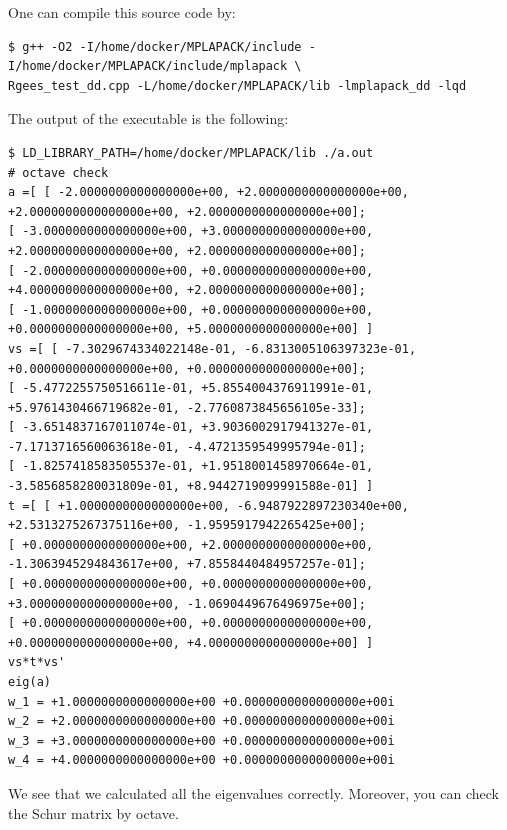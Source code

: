 \documentclass[12pt]{article}
\begin{document}
One can compile this source code by:
\begin{verbatim}
$ g++ -O2 -I/home/docker/MPLAPACK/include -I/home/docker/MPLAPACK/include/mplapack \
Rgees_test_dd.cpp -L/home/docker/MPLAPACK/lib -lmplapack_dd -lqd
\end{verbatim}
The output of the executable is the following:
{\footnotesize
\begin{verbatim}
$ LD_LIBRARY_PATH=/home/docker/MPLAPACK/lib ./a.out
# octave check
a =[ [ -2.0000000000000000e+00, +2.0000000000000000e+00, +2.0000000000000000e+00, +2.0000000000000000e+00];
[ -3.0000000000000000e+00, +3.0000000000000000e+00, +2.0000000000000000e+00, +2.0000000000000000e+00];
[ -2.0000000000000000e+00, +0.0000000000000000e+00, +4.0000000000000000e+00, +2.0000000000000000e+00];
[ -1.0000000000000000e+00, +0.0000000000000000e+00, +0.0000000000000000e+00, +5.0000000000000000e+00] ]
vs =[ [ -7.3029674334022148e-01, -6.8313005106397323e-01, +0.0000000000000000e+00, +0.0000000000000000e+00];
[ -5.4772255750516611e-01, +5.8554004376911991e-01, +5.9761430466719682e-01, -2.7760873845656105e-33];
[ -3.6514837167011074e-01, +3.9036002917941327e-01, -7.1713716560063618e-01, -4.4721359549995794e-01];
[ -1.8257418583505537e-01, +1.9518001458970664e-01, -3.5856858280031809e-01, +8.9442719099991588e-01] ]
t =[ [ +1.0000000000000000e+00, -6.9487922897230340e+00, +2.5313275267375116e+00, -1.9595917942265425e+00];
[ +0.0000000000000000e+00, +2.0000000000000000e+00, -1.3063945294843617e+00, +7.8558440484957257e-01];
[ +0.0000000000000000e+00, +0.0000000000000000e+00, +3.0000000000000000e+00, -1.0690449676496975e+00];
[ +0.0000000000000000e+00, +0.0000000000000000e+00, +0.0000000000000000e+00, +4.0000000000000000e+00] ]
vs*t*vs'
eig(a)
w_1 = +1.0000000000000000e+00 +0.0000000000000000e+00i
w_2 = +2.0000000000000000e+00 +0.0000000000000000e+00i
w_3 = +3.0000000000000000e+00 +0.0000000000000000e+00i
w_4 = +4.0000000000000000e+00 +0.0000000000000000e+00i
\end{verbatim}
}
We see that we calculated all the eigenvalues correctly. Moreover, you can check the Schur matrix by octave.
\end{document}
